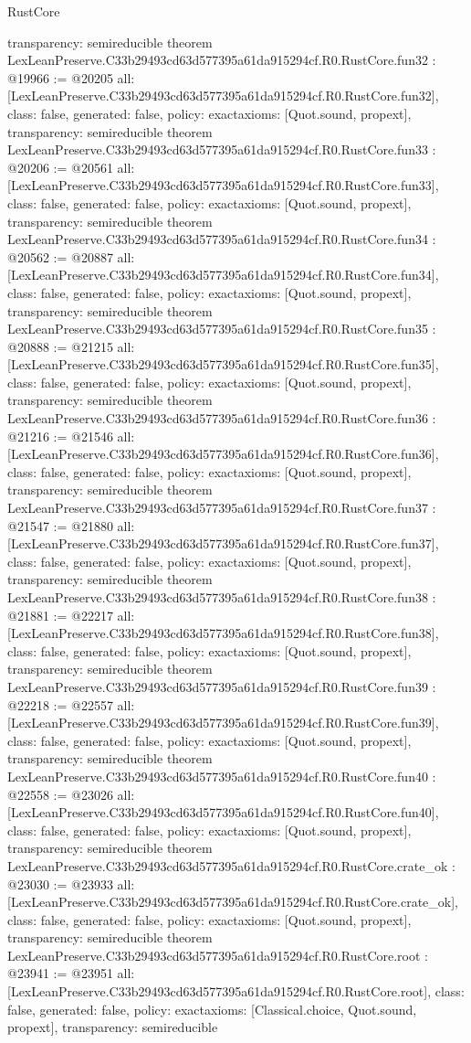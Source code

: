 \begin{lexlean}{RustCore}
\begin{coremodule}
{  transparency: semireducible
}
theorem LexLeanPreserve.C33b29493cd63d577395a61da915294cf.R0.RustCore.fun32 : @19966 := @20205 {
  all: [LexLeanPreserve.C33b29493cd63d577395a61da915294cf.R0.RustCore.fun32],
  class: false,
  generated: false,
  policy: exact{axioms: [Quot.sound, propext]},
  transparency: semireducible
}
theorem LexLeanPreserve.C33b29493cd63d577395a61da915294cf.R0.RustCore.fun33 : @20206 := @20561 {
  all: [LexLeanPreserve.C33b29493cd63d577395a61da915294cf.R0.RustCore.fun33],
  class: false,
  generated: false,
  policy: exact{axioms: [Quot.sound, propext]},
  transparency: semireducible
}
theorem LexLeanPreserve.C33b29493cd63d577395a61da915294cf.R0.RustCore.fun34 : @20562 := @20887 {
  all: [LexLeanPreserve.C33b29493cd63d577395a61da915294cf.R0.RustCore.fun34],
  class: false,
  generated: false,
  policy: exact{axioms: [Quot.sound, propext]},
  transparency: semireducible
}
theorem LexLeanPreserve.C33b29493cd63d577395a61da915294cf.R0.RustCore.fun35 : @20888 := @21215 {
  all: [LexLeanPreserve.C33b29493cd63d577395a61da915294cf.R0.RustCore.fun35],
  class: false,
  generated: false,
  policy: exact{axioms: [Quot.sound, propext]},
  transparency: semireducible
}
theorem LexLeanPreserve.C33b29493cd63d577395a61da915294cf.R0.RustCore.fun36 : @21216 := @21546 {
  all: [LexLeanPreserve.C33b29493cd63d577395a61da915294cf.R0.RustCore.fun36],
  class: false,
  generated: false,
  policy: exact{axioms: [Quot.sound, propext]},
  transparency: semireducible
}
theorem LexLeanPreserve.C33b29493cd63d577395a61da915294cf.R0.RustCore.fun37 : @21547 := @21880 {
  all: [LexLeanPreserve.C33b29493cd63d577395a61da915294cf.R0.RustCore.fun37],
  class: false,
  generated: false,
  policy: exact{axioms: [Quot.sound, propext]},
  transparency: semireducible
}
theorem LexLeanPreserve.C33b29493cd63d577395a61da915294cf.R0.RustCore.fun38 : @21881 := @22217 {
  all: [LexLeanPreserve.C33b29493cd63d577395a61da915294cf.R0.RustCore.fun38],
  class: false,
  generated: false,
  policy: exact{axioms: [Quot.sound, propext]},
  transparency: semireducible
}
theorem LexLeanPreserve.C33b29493cd63d577395a61da915294cf.R0.RustCore.fun39 : @22218 := @22557 {
  all: [LexLeanPreserve.C33b29493cd63d577395a61da915294cf.R0.RustCore.fun39],
  class: false,
  generated: false,
  policy: exact{axioms: [Quot.sound, propext]},
  transparency: semireducible
}
theorem LexLeanPreserve.C33b29493cd63d577395a61da915294cf.R0.RustCore.fun40 : @22558 := @23026 {
  all: [LexLeanPreserve.C33b29493cd63d577395a61da915294cf.R0.RustCore.fun40],
  class: false,
  generated: false,
  policy: exact{axioms: [Quot.sound, propext]},
  transparency: semireducible
}
theorem LexLeanPreserve.C33b29493cd63d577395a61da915294cf.R0.RustCore.crate_ok : @23030 := @23933 {
  all: [LexLeanPreserve.C33b29493cd63d577395a61da915294cf.R0.RustCore.crate_ok],
  class: false,
  generated: false,
  policy: exact{axioms: [Quot.sound, propext]},
  transparency: semireducible
}
theorem LexLeanPreserve.C33b29493cd63d577395a61da915294cf.R0.RustCore.root : @23941 := @23951 {
  all: [LexLeanPreserve.C33b29493cd63d577395a61da915294cf.R0.RustCore.root],
  class: false,
  generated: false,
  policy: exact{axioms: [Classical.choice, Quot.sound, propext]},
  transparency: semireducible
}


\end{coremodule}
\end{lexlean}

